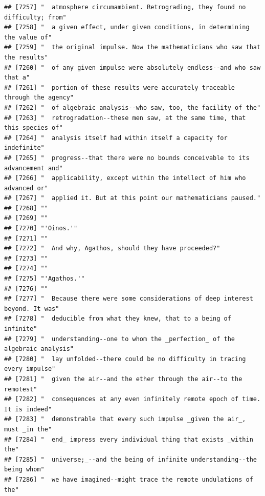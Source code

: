 \documentclass{article}\usepackage[]{graphicx}\usepackage[]{color}
\makeatletter
\newenvironment{kframe}{%
 \def\at@end@of@kframe{}%
 \ifinner\ifhmode%
  \def\at@end@of@kframe{\end{minipage}}%
  \begin{minipage}{\columnwidth}%
 \fi\fi%
 \def\FrameCommand##1{\hskip\@totalleftmargin \hskip-\fboxsep
 \colorbox{shadecolor}{##1}\hskip-\fboxsep
     \hskip-\linewidth \hskip-\@totalleftmargin \hskip\columnwidth}%
 \MakeFramed {\advance\hsize-\width
   \@totalleftmargin\z@ \linewidth\hsize
   \@setminipage}}%
 {\par\unskip\endMakeFramed%
 \at@end@of@kframe}
\newenvironment{knitrout}{}{} %
\makeatother
\begin{document}
\begin{knitrout}
\begin{kframe}
\begin{verbatim}
## [7257] "  atmosphere circumambient. Retrograding, they found no difficulty; from"    
## [7258] "  a given effect, under given conditions, in determining the value of"       
## [7259] "  the original impulse. Now the mathematicians who saw that the results"     
## [7260] "  of any given impulse were absolutely endless--and who saw that a"          
## [7261] "  portion of these results were accurately traceable through the agency"     
## [7262] "  of algebraic analysis--who saw, too, the facility of the"                  
## [7263] "  retrogradation--these men saw, at the same time, that this species of"     
## [7264] "  analysis itself had within itself a capacity for indefinite"               
## [7265] "  progress--that there were no bounds conceivable to its advancement and"    
## [7266] "  applicability, except within the intellect of him who advanced or"         
## [7267] "  applied it. But at this point our mathematicians paused."                  
## [7268] ""                                                                            
## [7269] ""                                                                            
## [7270] "'Oinos.'"                                                                    
## [7271] ""                                                                            
## [7272] "  And why, Agathos, should they have proceeded?"                             
## [7273] ""                                                                            
## [7274] ""                                                                            
## [7275] "'Agathos.'"                                                                  
## [7276] ""                                                                            
## [7277] "  Because there were some considerations of deep interest beyond. It was"    
## [7278] "  deducible from what they knew, that to a being of infinite"                
## [7279] "  understanding--one to whom the _perfection_ of the algebraic analysis"     
## [7280] "  lay unfolded--there could be no difficulty in tracing every impulse"       
## [7281] "  given the air--and the ether through the air--to the remotest"             
## [7282] "  consequences at any even infinitely remote epoch of time. It is indeed"    
## [7283] "  demonstrable that every such impulse _given the air_, must _in the"        
## [7284] "  end_ impress every individual thing that exists _within the"               
## [7285] "  universe;_--and the being of infinite understanding--the being whom"       
## [7286] "  we have imagined--might trace the remote undulations of the"               

\end{verbatim}
\end{kframe}
\end{knitrout}
\end{document}
